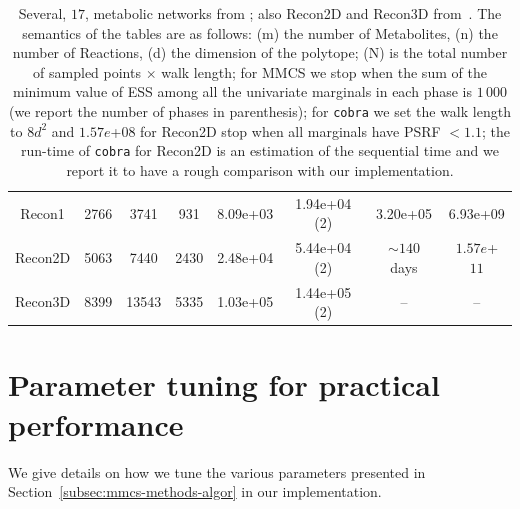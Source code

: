 \begin{table}[t]
\begin{tabular}{|c||c|c|c||c|c||c|c|}
      Recon1 & 2766 & 3741 & 931 & 8.09e+03 & 1.94e+04 (2) & 3.20e+05  & 6.93e+09 \\
      Recon2D & 5063 & 7440 & 2430 & 2.48e+04  &  5.44e+04 (2)  & $\sim 140$ days & $1.57e$+$11$   \\
      Recon3D  & 8399 & 13543 & 5335 & 1.03e+05 &  1.44e+05 (2) & -- & -- \\
      \hline
      \end{tabular}
      \caption[Recon2 and Recond3D distribution comparison]{\label{tab:results1} 
      Several, $17$, metabolic networks from 
         \citep{king2016bigg}; also  Recon2D and Recon3D from~\citep{noronha2019virtual}.
         The semantics of the tables are as follows: (m) the number of Metabolites,
         (n) the number of Reactions, %
         (d) the dimension of the polytope; (N) is the total number of sampled
         points $\times$ walk length; for MMCS we stop when the sum of the minimum
         value of ESS among all the univariate marginals in each phase is $1\,000$
         (we report the number of phases in parenthesis); for \texttt{cobra} we set the
         walk length to $8d^2$ and $1.57e$+$08$ for Recon2D
         stop when all marginals have PSRF $< 1.1$; the run-time of \texttt{cobra} for
         Recon2D is an estimation of the sequential time and we report it to have a
         rough comparison with our implementation.}
   \end{table}


\section{Parameter tuning for practical performance}\label{subsec:implementation}

   We give details on how we tune the various parameters presented 
   in Section~\ref{subsec:mmcs-methods-algor} in our implementation.

